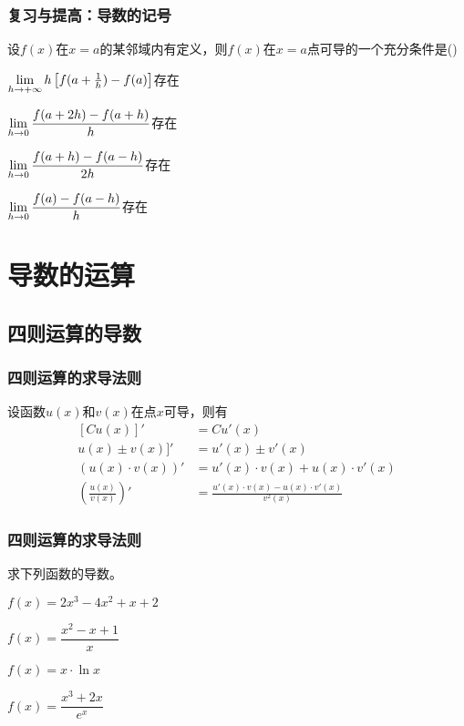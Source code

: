 \documentclass[14pt,notheorems,leqno,xcolor={rgb}]{beamer} %
\begin{document}
\begin{iframe}
\frametitle{复习与提高：导数的记号}
\begin{choice}
设$f(x)$在$x=a$的某邻域内有定义，则$f(x)$在$x=a$点可导的一个充分条件是\dotfill()
\begin{choiceline}
  \item $\lim\limits_{h\to+\infty}h\left[f(a+\frac1h)-f(a)\right]$存在
  \item $\lim\limits_{h\to0}\dfrac{f(a+2h)-f(a+h)}{h}$存在
  \item $\lim\limits_{h\to0}\dfrac{f(a+h)-f(a-h)}{2h}$存在
  \item $\lim\limits_{h\to0}\dfrac{f(a)-f(a-h)}{h}$存在
\end{choiceline}
\end{choice}
\end{iframe}

\section{导数的运算}

\subsection{四则运算的导数}

\begin{frame}
\frametitle{四则运算的求导法则}
\begin{theorem}
设函数$u(x)$和$v(x)$在点$x$可导，则有
\begin{align*}
\tag{1}  [Cu(x)]'&=Cu'(x)\\
\tag{2}  u(x)\pm v(x)]'&=u'(x)\pm v'(x) \\
\tag{3}  \left(u(x)\cdot v(x)\right)'&=u'(x)\cdot v(x)+u(x)\cdot v'(x)\\
\tag{4}  \left(\frac{u(x)}{v(x)}\right)'&=\frac{u'(x)\cdot v(x)-u(x)\cdot v'(x)}{v^2(x)}
\end{align*}
\end{theorem}
\end{frame}

\begin{frame}
\frametitle{四则运算的求导法则}
\begin{example}
求下列函数的导数。
\begin{enumlite}
  \item $f(x)=2x^3-4x^2+x+2$
  \item $f(x)=\dfrac{x^2-x+1}{x}$
  \item $f(x)=x\cdot\ln x$
  \item $f(x)=\dfrac{x^3+2x}{e^x}$
\end{enumlite}
\end{example}
\end{frame}
\end{document}
